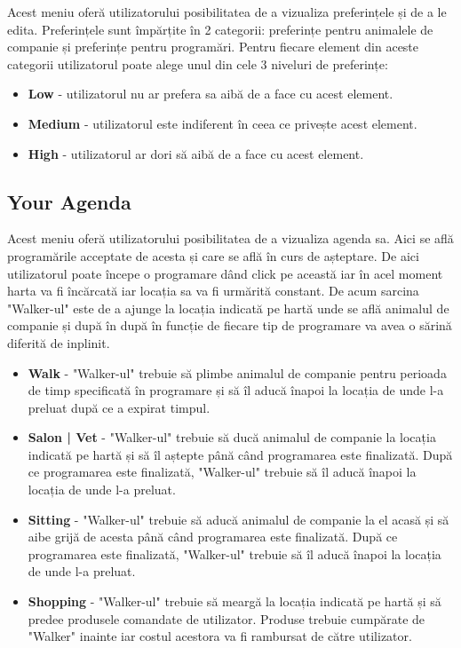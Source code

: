 Acest meniu oferă utilizatorului posibilitatea de a vizualiza preferințele și de a le edita. Preferințele sunt împărțite în 2 categorii: preferințe pentru animalele de companie și preferințe pentru programări. Pentru fiecare element din aceste categorii utilizatorul poate alege unul din cele 3 niveluri de preferințe:

\begin{itemize}
    \item \textbf{Low} - utilizatorul nu ar prefera sa aibă de a face cu acest element.
    \item \textbf{Medium} - utilizatorul este indiferent în ceea ce privește acest element.
    \item \textbf{High} - utilizatorul ar dori să aibă de a face cu acest element.
\end{itemize}

\newpage

\subsection{Your Agenda}

Acest meniu oferă utilizatorului posibilitatea de a vizualiza agenda sa. Aici se află programările acceptate de acesta și care se află în curs de așteptare. De aici utilizatorul poate începe o programare dând click pe această iar în acel moment harta va fi încărcată iar locația sa va fi urmărită constant. De acum sarcina "Walker-ul" este de a ajunge la locația indicată pe hartă unde se află animalul de companie și după în după în funcție de fiecare tip de programare va avea o sărină diferită de inplinit. 


\begin{itemize}
    \item \textbf{Walk} - "Walker-ul" trebuie să plimbe animalul de companie pentru perioada de timp specificată în programare și să îl aducă înapoi la locația de unde l-a preluat după ce a expirat timpul.
    \item \textbf{Salon | Vet} - "Walker-ul" trebuie să ducă animalul de companie la locația indicată pe hartă și să îl aștepte până când programarea este finalizată. După ce programarea este finalizată, "Walker-ul" trebuie să îl aducă înapoi la locația de unde l-a preluat. 
    \item \textbf{Sitting} - "Walker-ul" trebuie să aducă animalul de companie la el acasă și să aibe grijă de acesta până când programarea este finalizată. După ce programarea este finalizată, "Walker-ul" trebuie să îl aducă înapoi la locația de unde l-a preluat.
    \item \textbf{Shopping} - "Walker-ul" trebuie să meargă la locația indicată pe hartă și să predee produsele comandate de utilizator. Produse trebuie cumpărate de "Walker" inainte iar costul acestora va fi rambursat de către utilizator.
\end{itemize}

